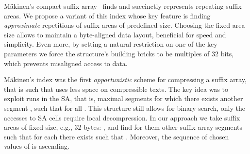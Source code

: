 \documentclass{cai}
\begin{document}
M{\"a}kinen's compact suffix
array~\cite{DBLP:conf/cpm/Makinen00,DBLP:journals/fuin/Makinen03} 
finds and succinctly represents repeating suffix areas.
We propose a variant of this index
whose key feature is 
finding {\em approximate} repetitions of suffix areas of predefined size.
Choosing the fixed area size 
allows to maintain a byte-aligned data layout, 
beneficial for speed and simplicity.
Even more, by setting a natural restriction on one of the key parameters 
we force the structure's building bricks to be multiples of 32 bits, 
which prevents misaligned access to data.

M{\"a}kinen's index was the first {\em opportunistic} scheme for 
compressing a suffix array, that is such that uses less space on compressible 
texts.
The key idea was to exploit runs in the SA, that is, maximal 
segments  for which there exists another 
segment , such that  
for all .
This structure still allows for binary search, only the accesses to SA cells 
require local decompression.
In our approach we take suffix areas of fixed size, e.g., 32 bytes: 
, and find for them other suffix array segments 
 such that for each  there exists  such that . 
Moreover, the sequence of chosen values of  is ascending. 
\end{document}
